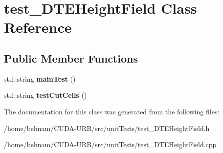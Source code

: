 \hypertarget{classtest__DTEHeightField}{}\section{test\+\_\+\+D\+T\+E\+Height\+Field Class Reference}
\label{classtest__DTEHeightField}
\subsection*{Public Member Functions}
\begin{DoxyCompactItemize}
\item 
\mbox{\label{classtest__DTEHeightField_a833fda69bccf37e1e72e8d0d4cd21a89}} 
std\+::string {\bfseries main\+Test} ()
\item 
\mbox{\label{classtest__DTEHeightField_a2a200d1cb0f75d748074b4c753b7ff3a}} 
std\+::string {\bfseries test\+Cut\+Cells} ()
\end{DoxyCompactItemize}


The documentation for this class was generated from the following files\+:\begin{DoxyCompactItemize}
\item 
/home/behnam/\+C\+U\+D\+A-\/\+U\+R\+B/src/unit\+Tests/test\+\_\+\+D\+T\+E\+Height\+Field.\+h\item 
/home/behnam/\+C\+U\+D\+A-\/\+U\+R\+B/src/unit\+Tests/test\+\_\+\+D\+T\+E\+Height\+Field.\+cpp\end{DoxyCompactItemize}
